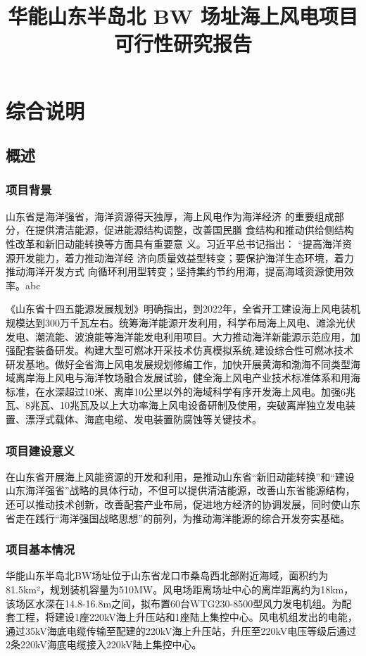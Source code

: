\documentclass[12pt, letterpaper]{article}
\title{ \textbf{华能山东半岛北 BW 场址海上风电项目} \\
	可行性研究报告}
\begin{document}
	
	\maketitle
	
	\tableofcontents
	
	\section{综合说明}
	\subsection{概述}
	\subsubsection{项目背景}
	山东省是海洋强省，海洋资源得天独厚，海上风电作为海洋经济
	的重要组成部分，在提供清洁能源，促进能源结构调整，改善国民膳
	食结构和推动供给侧结构性改革和新旧动能转换等方面具有重要意
	义。习近平总书记指出： “提高海洋资源开发能力，着力推动海洋经
	济向质量效益型转变；要保护海洋生态环境，着力推动海洋开发方式
	向循环利用型转变；坚持集约节约用海，提高海域资源使用效率。abc
	
	
	《山东省十四五能源发展规划》明确指出，到2022年，全省开工建设海上风电装机规模达到300万千瓦左右。统筹海洋能源开发利用，科学布局海上风电、滩涂光伏发电、潮流能、波浪能等海洋能发电利用项目。大力推动海洋新能源示范应用，加强配套装备研发。构建大型可燃冰开采技术仿真模拟系统,建设综合性可燃冰技术研发基地。做好全省海上风电发展规划修编工作，加快开展黄海和渤海不同类型海域离岸海上风电与海洋牧场融合发展试验，健全海上风电产业技术标准体系和用海标准，在水深超过10米、离岸10公里以外的海域科学有序开发海上风电。加强6兆瓦、8兆瓦、10兆瓦及以上大功率海上风电设备研制及使用，突破离岸独立发电装置、漂浮式载体、海底电缆、发电装置防腐蚀等关键技术。
	
	\subsubsection{项目建设意义}
	在山东省开展海上风能资源的开发和利用，是推动山东省“新旧动能转换”和“建设山东海洋强省”战略的具体行动，不但可以提供清洁能源，改善山东省能源结构，还可以推动技术创新，改善配套产业布局，促进地方经济的协调发展，同时使山东省走在践行“海洋强国战略思想”的前列，为推动海洋能源的综合开发夯实基础。
	
	\subsubsection{项目基本情况}
	华能山东半岛北BW场址位于山东省龙口市桑岛西北部附近海域，面积约为81.5km²，规划装机容量为510MW。风电场距离场址中心的离岸距离约为18km，该场区水深在14.8-16.8m之间，拟布置60台WTG230-8500型风力发电机组。为配套工程，将建设1座220kV海上升压站和1座陆上集控中心。风电机组发出的电能，通过35kV海底电缆传输至配建的220kV海上升压站，升压至220kV电压等级后通过2条220kV海底电缆接入220kV陆上集控中心。
	
\end{document}
